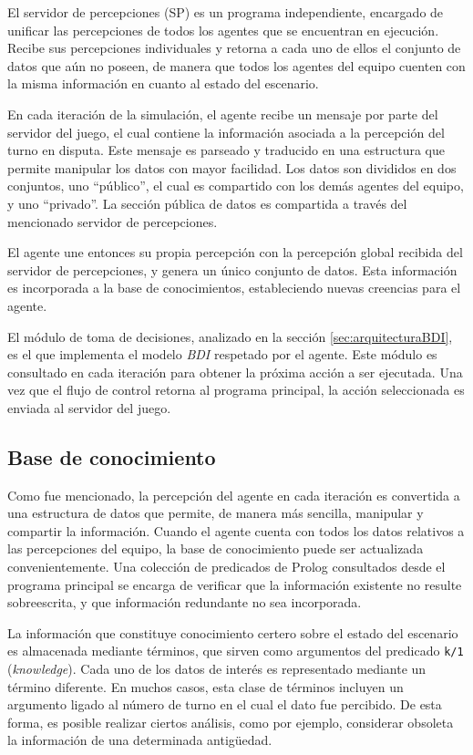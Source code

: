 \documentclass[oneside]{book}
\theoremstyle{definition}
\begin{document}
El servidor de percepciones (SP) es un programa independiente, encargado de unificar las 
percepciones de todos los agentes que se encuentran en ejecución. Recibe sus percepciones 
individuales y retorna a cada uno de ellos el conjunto de datos que aún no poseen, de 
manera que todos los agentes del equipo cuenten con la misma información en cuanto al estado 
del escenario.

En cada iteración de la simulación, el agente recibe un mensaje por parte del servidor 
del juego, el cual contiene la información asociada a la percepción del turno en disputa. 
Este mensaje es parseado y traducido en una estructura que permite manipular los datos 
con mayor facilidad. Los datos son divididos en dos conjuntos, uno ``público'', el cual 
es compartido con los demás agentes del equipo, y uno ``privado''. La sección pública de 
datos es compartida a través del mencionado servidor de percepciones.

El agente une entonces su propia percepción con la percepción global recibida del servidor 
de percepciones, y genera un único conjunto de datos. Esta información es incorporada a la 
base de conocimientos, estableciendo nuevas creencias para el agente.

El módulo de toma de decisiones, analizado en la sección \ref{sec:arquitecturaBDI}, es el 
que implementa el modelo \textit{BDI} respetado por el agente. Este módulo es consultado en cada 
iteración para obtener la próxima acción a ser ejecutada. Una vez que el flujo de control 
retorna al programa principal, la acción seleccionada es enviada al servidor del juego.

\subsection{Base de conocimiento}


Como fue mencionado, la percepción del agente en cada iteración es convertida a una 
estructura de datos que permite, de manera más sencilla, manipular y compartir la 
información. Cuando el agente cuenta con todos los datos relativos a las percepciones 
del equipo, la base de conocimiento puede ser actualizada convenientemente. Una colección 
de predicados de Prolog consultados desde el programa principal se encarga de verificar 
que la información existente no resulte sobreescrita, y que información redundante no sea 
incorporada. 

La información que constituye conocimiento certero sobre el estado del escenario es 
almacenada mediante términos, que sirven como argumentos del predicado \texttt{k/1} 
(\textit{knowledge}). Cada uno de los datos de interés es representado mediante un 
término diferente. 
En muchos casos, esta clase de términos incluyen un argumento ligado al número de turno 
en el cual el dato fue percibido. De esta forma, es posible realizar ciertos análisis, 
como por ejemplo, considerar obsoleta la información de una determinada antigüedad.
\end{document}

